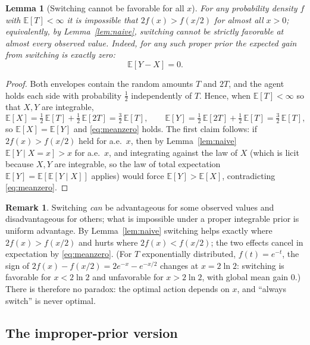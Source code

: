 \documentclass{amsart}
\theoremstyle{plain}
\newtheorem{lemma}{Lemma}
\theoremstyle{definition}
\newtheorem{remark}{Remark}
\begin{document}
\begin{lemma}[Switching cannot be favorable for all $x$]\label{lem:notall}
For any probability density $f$ with $\mathbb E[T]<\infty$ it is impossible that
$2f(x)>f(x/2)$ for almost all $x>0$; equivalently, by Lemma~\ref{lem:naive},
switching cannot be strictly favorable at almost every observed value. Indeed,
for any such proper prior the expected gain from switching is exactly zero:
\begin{equation}\label{eq:meanzero}
\mathbb E[Y-X]=0 .
\end{equation}
\end{lemma}

\begin{proof}
Both envelopes contain the random amounts $T$ and $2T$, and the agent holds each
side with probability $\tfrac12$ independently of $T$. Hence, when
$\mathbb E[T]<\infty$ so that $X,Y$ are integrable,
\[
\mathbb E[X]=\tfrac12\,\mathbb E[T]+\tfrac12\,\mathbb E[2T]=\tfrac32\,\mathbb E[T],
\qquad
\mathbb E[Y]=\tfrac12\,\mathbb E[2T]+\tfrac12\,\mathbb E[T]=\tfrac32\,\mathbb E[T],
\]
so $\mathbb E[X]=\mathbb E[Y]$ and \eqref{eq:meanzero} holds. The first claim
follows: if $2f(x)>f(x/2)$ held for a.e.\ $x$, then by Lemma~\ref{lem:naive}
$\mathbb E[Y\mid X=x]>x$ for a.e.\ $x$, and integrating against the law of $X$
(which is licit because $X,Y$ are integrable, so the law of total expectation
$\mathbb E[Y]=\mathbb E[\mathbb E[Y\mid X]]$ applies) would force
$\mathbb E[Y]>\mathbb E[X]$, contradicting \eqref{eq:meanzero}.
\end{proof}

\begin{remark}\label{rem:proper}
Switching \emph{can} be advantageous for some observed values and disadvantageous
for others; what is impossible under a proper integrable prior is uniform
advantage. By Lemma~\ref{lem:naive} switching helps exactly where
$2f(x)>f(x/2)$ and hurts where $2f(x)<f(x/2)$; the two effects cancel in
expectation by \eqref{eq:meanzero}. (For $T$ exponentially distributed, $f(t)=e^{-t}$, the sign of
$2f(x)-f(x/2)=2e^{-x}-e^{-x/2}$ changes at $x=2\ln 2$: switching is favorable
for $x<2\ln2$ and unfavorable for $x>2\ln2$, with global mean gain $0$.) There is therefore no paradox: the optimal action
depends on $x$, and ``always switch'' is never optimal.
\end{remark}

\subsection{The improper-prior version}
\end{document}
